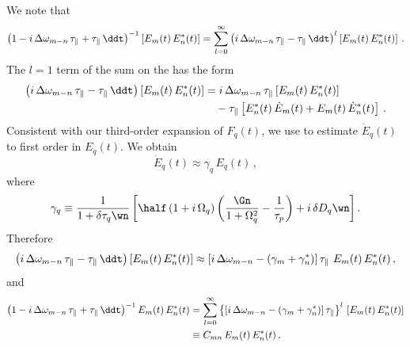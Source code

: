 We note that
 \begin{equation} %
\left(1 - i\, \Delta \omega_{m - n} \, \tau_\parallel + \tau_\parallel\, \ddt\right)^{-1} \left[E_m(t)\, E_n^\ast(t)\right] = \sum_{l = 0}^{\infty} \left( i\, \Delta \omega_{m - n} \, \tau_\parallel - \tau_\parallel\, \ddt \right)^l \left[ E_m(t)\, E_n^\ast(t)\right]\, .
 \end{equation}
The $l = 1$ term of the sum on the \rhs has the form
 \begin{equation}
 \begin{split}
\left( i\, \Delta \omega_{m - n} \, \tau_\parallel - \tau_\parallel\, \ddt \right) \left[ E_m(t)\, E_n^\ast(t)\right] &= i\, \Delta \omega_{m - n} \, \tau_\parallel \left[ E_m(t)\, E_n^\ast(t)\right] \\
&\quad - \tau_\parallel \left[E_n^\ast(t)\, \dot{E}_m(t) + E_m(t)\, \dot{E}_n^\ast(t)\right]\, .
 \end{split}
 \end{equation}
Consistent with our third-order expansion of $F_q(t)$, we use  to estimate $\dot{E}_q(t)$ to first order in $E_q(t)$. We obtain
 \begin{equation} %
 \dot{E}_q(t) \approx \gamma_q\, E_q(t)\, ,
 \end{equation}
where
 \begin{equation} \label{eqn:mml_1d_gamma_q_def}
 \gamma_q \equiv \frac{1}{1 + \delta \tau_q\wn} \left[ \half \left( 1 + i\, \Omega_q \right) \left( \frac{\Gn}{1 + \Omega_q^2} - \frac{1}{\tau_p} \right) + i\, \delta D_q\wn \right] .
 \end{equation}
Therefore
 \begin{equation}
\left( i\, \Delta \omega_{m - n} \, \tau_\parallel - \tau_\parallel\, \ddt \right) \left[ E_m(t)\, E_n^\ast(t)\right] \approx \left[ i\, \Delta \omega_{m - n} - \left(\gamma_m + \gamma_n^\ast\right) \right] \tau_\parallel\, \, E_m(t)\, E_n^\ast(t)\, ,
 \end{equation}
and
 \begin{equation}
 \begin{split}
\left(1 - i\, \Delta \omega_{m - n} \, \tau_\parallel + \tau_\parallel\, \ddt\right)^{-1} E_m(t)\, E_n^\ast(t) &= \sum_{l = 0}^{\infty} \left\{\left[ i\, \Delta \omega_{m - n} - \left(\gamma_m + \gamma_n^\ast\right) \right] \tau_\parallel\right\}^l\, \left[ E_m(t)\, E_n^\ast(t)\right] \\
&\equiv C_{m n}\, E_m(t)\, E_n^\ast(t)\, ,
 \end{split}
 \end{equation}
